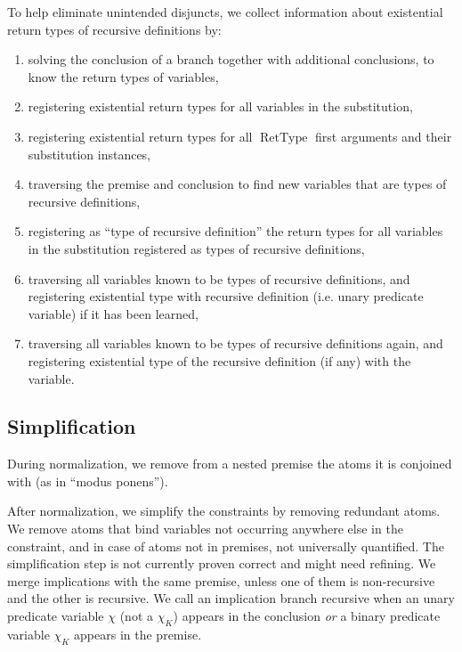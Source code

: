 \documentclass{article}
\newcommand{\tmem}[1]{{\em #1\/}}
\newcommand{\tmop}[1]{\ensuremath{\operatorname{#1}}}
\begin{document}
To help eliminate unintended disjuncts, we collect information about
existential return types of recursive definitions by:
\begin{enumerate}
  \item solving the conclusion of a branch together with additional
  conclusions, to know the return types of variables,
  
  \item registering existential return types for all variables in the
  substitution,
  
  \item registering existential return types for all $\tmop{RetType}$ first
  arguments and their substitution instances,
  
  \item traversing the premise and conclusion to find new variables that are
  types of recursive definitions,
  
  \item registering as ``type of recursive definition'' the return types for
  all variables in the substitution registered as types of recursive
  definitions,
  
  \item traversing all variables known to be types of recursive definitions,
  and registering existential type with recursive definition (i.e. unary
  predicate variable) if it has been learned,
  
  \item traversing all variables known to be types of recursive definitions
  again, and registering existential type of the recursive definition (if any)
  with the variable.
\end{enumerate}

\subsection{Simplification}

During normalization, we remove from a nested premise the atoms it is
conjoined with (as in ``modus ponens'').

After normalization, we simplify the constraints by removing redundant atoms.
We remove atoms that bind variables not occurring anywhere else in the
constraint, and in case of atoms not in premises, not universally quantified.
The simplification step is not currently proven correct and might need
refining. We merge implications with the same premise, unless one of them is
non-recursive and the other is recursive. We call an implication branch
recursive when an unary predicate variable $\chi$ (not a $\chi_K$) appears in
the conclusion {\tmem{or}} a binary predicate variable $\chi_K$ appears in the
premise.
\end{document}
